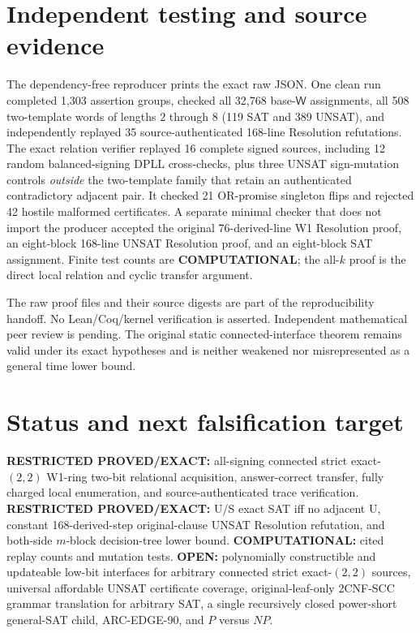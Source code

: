 \documentclass[11pt]{article}
\newcommand{\W}{\mathsf{W}}
\begin{document}
\section{Independent testing and source evidence}
The dependency-free reproducer prints the exact raw JSON. One clean run completed 1,303 assertion groups, checked all 32,768 base-$\W$ assignments, all 508 two-template words of lengths $2$ through $8$ (119 SAT and 389 UNSAT), and independently replayed 35 source-authenticated 168-line Resolution refutations. The exact relation verifier replayed 16 complete signed sources, including 12 random balanced-signing DPLL cross-checks, plus three UNSAT sign-mutation controls \emph{outside} the two-template family that retain an authenticated contradictory adjacent pair. It checked 21 OR-promise singleton flips and rejected 42 hostile malformed certificates. A separate minimal checker that does not import the producer accepted the original 76-derived-line W1 Resolution proof, an eight-block 168-line UNSAT Resolution proof, and an eight-block SAT assignment. Finite test counts are \textbf{COMPUTATIONAL}; the all-$k$ proof is the direct local relation and cyclic transfer argument.

The raw proof files and their source digests are part of the reproducibility handoff. No Lean/Coq/kernel verification is asserted. Independent mathematical peer review is pending. The original static connected-interface theorem remains valid under its exact hypotheses and is neither weakened nor misrepresented as a general time lower bound.

\section{Status and next falsification target}
\textbf{RESTRICTED PROVED/EXACT:} all-signing connected strict exact-$(2,2)$ W1-ring two-bit relational acquisition, answer-correct transfer, fully charged local enumeration, and source-authenticated trace verification. \textbf{RESTRICTED PROVED/EXACT:} U/S exact SAT iff no adjacent U, constant 168-derived-step original-clause UNSAT Resolution refutation, and both-side $m$-block decision-tree lower bound. \textbf{COMPUTATIONAL:} cited replay counts and mutation tests. \textbf{OPEN:} polynomially constructible and updateable low-bit interfaces for arbitrary connected strict exact-$(2,2)$ sources, universal affordable UNSAT certificate coverage, original-leaf-only 2CNF-SCC grammar translation for arbitrary SAT, a single recursively closed power-short general-SAT child, ARC-EDGE-90, and $P$ versus $NP$.
\end{document}
